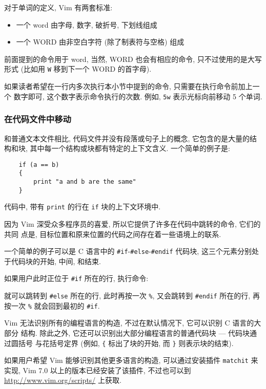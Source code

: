 对于单词的定义, Vim 有两套标准:
\begin{itemize}
    \item 一个 word 由字母, 数字, 破折号, 下划线组成
    \item 一个 WORD 由非空白字符 (除了制表符与空格) 组成
\end{itemize}
前面提到的命令用于 word, 当然, WORD 也会有相应的命令, 只不过使用的是大写形式
(比如用 \texttt{W} 移到下一个 WORD 的首字母).
\begin{warning}
    如果读者希望在一行内多次执行本小节中提到的命令, 只需要在执行命令前加上一个
    数字即可, 这个数字表示命令执行的次数. 例如, \texttt{5w} 表示光标向前移动 5
    个单词.
\end{warning}

\subsubsection{在代码文件中移动}
\label{subsubsec:moving_in_a_code_file}

和普通文本文件相比, 代码文件并没有段落或句子上的概念, 它包含的是大量的结构和块,
其中每一个结构或块都有特定的上下文含义. 一个简单的例子是:
\begin{verbatim}
    if (a == b)
    {
        print "a and b are the same"
    }
\end{verbatim}
代码中, 带有 \texttt{print} 的行在 \texttt{if} 块的上下文环境中.

因为 Vim 深受众多程序员的喜爱, 所以它提供了许多在代码中跳转的命令, 它们的共同
点是, 目标位置和原来位置的代码之间存在着一些语境上的联系.

一个简单的例子可以是 C 语言中的 \texttt{\#if}-\texttt{\#else}-\texttt{\#endif}
代码块, 这三个元素分别处于代码块的开始, 中间, 和结束.

如果用户此时正位于 \texttt{\#if} 所在的行, 执行命令:
\begin{vimcode}
%
\end{vimcode}
就可以跳转到 \texttt{\#else} 所在的行, 此时再按一次 \verb'%', 又会跳转到
\texttt{\#endif} 所在的行, 再按一次 \verb'%' 就会回到最初的 \texttt{\#if}.

Vim 无法识别所有的编程语言的构造, 不过在默认情况下, 它可以识别 C 语言的大部分
结构. 除此之外, 它还可以识别出大部分编程语言的普通代码块 --- 代码块通过圆括号
与花括号定界 (例如, \verb'{' 标出了块的开始, 而 \verb'}' 则表示块的结束).
\begin{warning}
    如果用户希望 Vim 能够识别其他更多语言的构造, 可以通过安装插件
    \texttt{matchit} 来实现, Vim 7.0
    以上的版本已经安装了该插件, 不过也可以到 \url{http://www.vim.org/scripts/}
    上获取.
\end{warning}

